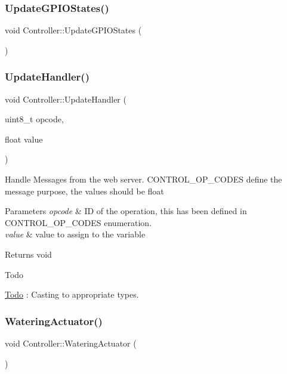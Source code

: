 \subsubsection{\texorpdfstring{Update\+G\+P\+I\+O\+States()}{UpdateGPIOStates()}}
{\footnotesize\ttfamily void Controller\+::\+Update\+G\+P\+I\+O\+States (\begin{DoxyParamCaption}{ }\end{DoxyParamCaption})}

\mbox{\label{classController_a0a17902e4a70fde975c989c5275e8f05}} 
\subsubsection{\texorpdfstring{Update\+Handler()}{UpdateHandler()}}
{\footnotesize\ttfamily void Controller\+::\+Update\+Handler (\begin{DoxyParamCaption}\item[{uint8\+\_\+t}]{opcode,  }\item[{float}]{value }\end{DoxyParamCaption})}

Handle Messages from the web server. C\+O\+N\+T\+R\+O\+L\+\_\+\+O\+P\+\_\+\+C\+O\+D\+ES define the message purpose, the values should be float


\begin{DoxyParams}{Parameters}
{\em opcode} & ID of the operation, this has been defined in C\+O\+N\+T\+R\+O\+L\+\_\+\+O\+P\+\_\+\+C\+O\+D\+ES enumeration. \\
\hline
{\em value} & value to assign to the variable\\
\hline
\end{DoxyParams}
\begin{DoxyReturn}{Returns}
void
\end{DoxyReturn}
\begin{DoxyRefDesc}{Todo}
\item[\hyperlink{todo__todo000001}{Todo}]\+: Casting to appropriate types. \end{DoxyRefDesc}
\mbox{\label{classController_a92e03a719890c12f2272b8a6b904d6e1}} 
\subsubsection{\texorpdfstring{Watering\+Actuator()}{WateringActuator()}}
{\footnotesize\ttfamily void Controller\+::\+Watering\+Actuator (\begin{DoxyParamCaption}{ }\end{DoxyParamCaption})\hspace{0.3cm}{\ttfamily [private]}}



